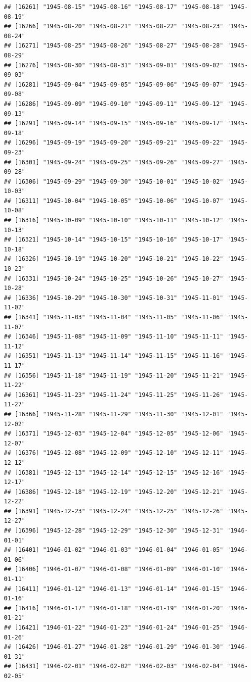 \documentclass{article}\usepackage[]{graphicx}\usepackage[]{color}
\makeatletter
\newenvironment{kframe}{%
 \def\at@end@of@kframe{}%
 \ifinner\ifhmode%
  \def\at@end@of@kframe{\end{minipage}}%
  \begin{minipage}{\columnwidth}%
 \fi\fi%
 \def\FrameCommand##1{\hskip\@totalleftmargin \hskip-\fboxsep
 \colorbox{shadecolor}{##1}\hskip-\fboxsep
     \hskip-\linewidth \hskip-\@totalleftmargin \hskip\columnwidth}%
 \MakeFramed {\advance\hsize-\width
   \@totalleftmargin\z@ \linewidth\hsize
   \@setminipage}}%
 {\par\unskip\endMakeFramed%
 \at@end@of@kframe}
\newenvironment{knitrout}{}{} %
\makeatother
\begin{document}
\begin{description}
\begin{knitrout}
\begin{kframe}
\begin{verbatim}
## [16261] "1945-08-15" "1945-08-16" "1945-08-17" "1945-08-18" "1945-08-19"
## [16266] "1945-08-20" "1945-08-21" "1945-08-22" "1945-08-23" "1945-08-24"
## [16271] "1945-08-25" "1945-08-26" "1945-08-27" "1945-08-28" "1945-08-29"
## [16276] "1945-08-30" "1945-08-31" "1945-09-01" "1945-09-02" "1945-09-03"
## [16281] "1945-09-04" "1945-09-05" "1945-09-06" "1945-09-07" "1945-09-08"
## [16286] "1945-09-09" "1945-09-10" "1945-09-11" "1945-09-12" "1945-09-13"
## [16291] "1945-09-14" "1945-09-15" "1945-09-16" "1945-09-17" "1945-09-18"
## [16296] "1945-09-19" "1945-09-20" "1945-09-21" "1945-09-22" "1945-09-23"
## [16301] "1945-09-24" "1945-09-25" "1945-09-26" "1945-09-27" "1945-09-28"
## [16306] "1945-09-29" "1945-09-30" "1945-10-01" "1945-10-02" "1945-10-03"
## [16311] "1945-10-04" "1945-10-05" "1945-10-06" "1945-10-07" "1945-10-08"
## [16316] "1945-10-09" "1945-10-10" "1945-10-11" "1945-10-12" "1945-10-13"
## [16321] "1945-10-14" "1945-10-15" "1945-10-16" "1945-10-17" "1945-10-18"
## [16326] "1945-10-19" "1945-10-20" "1945-10-21" "1945-10-22" "1945-10-23"
## [16331] "1945-10-24" "1945-10-25" "1945-10-26" "1945-10-27" "1945-10-28"
## [16336] "1945-10-29" "1945-10-30" "1945-10-31" "1945-11-01" "1945-11-02"
## [16341] "1945-11-03" "1945-11-04" "1945-11-05" "1945-11-06" "1945-11-07"
## [16346] "1945-11-08" "1945-11-09" "1945-11-10" "1945-11-11" "1945-11-12"
## [16351] "1945-11-13" "1945-11-14" "1945-11-15" "1945-11-16" "1945-11-17"
## [16356] "1945-11-18" "1945-11-19" "1945-11-20" "1945-11-21" "1945-11-22"
## [16361] "1945-11-23" "1945-11-24" "1945-11-25" "1945-11-26" "1945-11-27"
## [16366] "1945-11-28" "1945-11-29" "1945-11-30" "1945-12-01" "1945-12-02"
## [16371] "1945-12-03" "1945-12-04" "1945-12-05" "1945-12-06" "1945-12-07"
## [16376] "1945-12-08" "1945-12-09" "1945-12-10" "1945-12-11" "1945-12-12"
## [16381] "1945-12-13" "1945-12-14" "1945-12-15" "1945-12-16" "1945-12-17"
## [16386] "1945-12-18" "1945-12-19" "1945-12-20" "1945-12-21" "1945-12-22"
## [16391] "1945-12-23" "1945-12-24" "1945-12-25" "1945-12-26" "1945-12-27"
## [16396] "1945-12-28" "1945-12-29" "1945-12-30" "1945-12-31" "1946-01-01"
## [16401] "1946-01-02" "1946-01-03" "1946-01-04" "1946-01-05" "1946-01-06"
## [16406] "1946-01-07" "1946-01-08" "1946-01-09" "1946-01-10" "1946-01-11"
## [16411] "1946-01-12" "1946-01-13" "1946-01-14" "1946-01-15" "1946-01-16"
## [16416] "1946-01-17" "1946-01-18" "1946-01-19" "1946-01-20" "1946-01-21"
## [16421] "1946-01-22" "1946-01-23" "1946-01-24" "1946-01-25" "1946-01-26"
## [16426] "1946-01-27" "1946-01-28" "1946-01-29" "1946-01-30" "1946-01-31"
## [16431] "1946-02-01" "1946-02-02" "1946-02-03" "1946-02-04" "1946-02-05"

\end{verbatim}
\end{kframe}
\end{knitrout}
\end{description}
\end{document}
